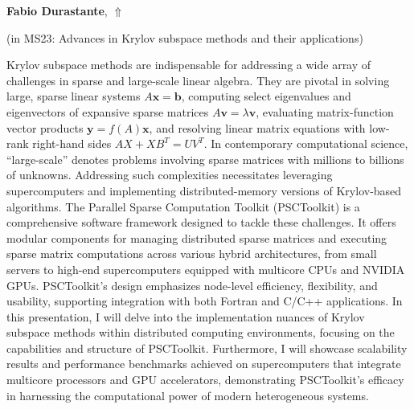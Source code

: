 \documentclass[ILAS2025-program.tex]{subfiles}
\begin{document}
\hypertarget{down0239}{}\begin{ilasabstract}
    
\textbf{Fabio Durastante},  \hfill \hyperlink{up0239}{$\Uparrow$}
    
    
(in {\color{mstitle}MS23: Advances in Krylov subspace methods and their applications})
        
\mtskip
    Krylov subspace methods are indispensable for addressing a wide array of challenges in sparse and large-scale linear algebra. They are pivotal in solving large, sparse linear systems \( A \mathbf{x} = \mathbf{b} \), computing select eigenvalues and eigenvectors of expansive sparse matrices \( A \mathbf{v} = \lambda \mathbf{v} \), evaluating matrix-function vector products \( \mathbf{y} = f(A) \mathbf{x} \), and resolving linear matrix equations with low-rank right-hand sides \( A X + X B^T = UV^T \).
In contemporary computational science, ``large-scale'' denotes problems involving sparse matrices with millions to billions of unknowns. Addressing such complexities necessitates leveraging supercomputers and implementing distributed-memory versions of Krylov-based algorithms. The Parallel Sparse Computation Toolkit (PSCToolkit) is a comprehensive software framework designed to tackle these challenges. It offers modular components for managing distributed sparse matrices and executing sparse matrix computations across various hybrid architectures, from small servers to high-end supercomputers equipped with multicore CPUs and NVIDIA GPUs. PSCToolkit's design emphasizes node-level efficiency, flexibility, and usability, supporting integration with both Fortran and C/C++ applications. In this presentation, I will delve into the implementation nuances of Krylov subspace methods within distributed computing environments, focusing on the capabilities and structure of PSCToolkit. Furthermore, I will showcase scalability results and performance benchmarks achieved on supercomputers that integrate multicore processors and GPU accelerators, demonstrating PSCToolkit's efficacy in harnessing the computational power of modern heterogeneous systems.

\end{ilasabstract}
    
\end{document}
